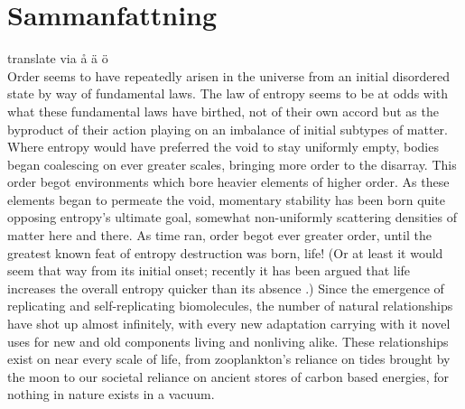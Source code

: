


\chapter{Sammanfattning}
translate via
\r{a} \"a \"o \\

Order seems to have repeatedly arisen in the universe from an initial disordered state by way of fundamental laws. The law of entropy seems to be at odds with what these fundamental laws have birthed, not of their own accord but as the byproduct of their action playing on an imbalance of initial subtypes of matter. Where entropy would have preferred the void to stay uniformly empty, bodies began coalescing on ever greater scales, bringing more order to the disarray. This order begot environments which bore heavier elements of higher order. As these elements began to permeate the void, momentary stability has been born quite opposing entropy's ultimate goal, somewhat non-uniformly scattering densities of matter here and there. As time ran, order begot ever greater order, until the greatest known feat of entropy destruction was born, life! (Or at least it would seem that way from its initial onset; recently it has been argued that life increases the overall entropy quicker than its absence \citep{england2013statistical}.) Since the emergence of replicating and self-replicating biomolecules, the number of natural relationships have shot up almost infinitely, with every new adaptation carrying with it novel uses for new and old components living and nonliving alike. These relationships exist on near every scale of life, from zooplankton's reliance on tides brought by the moon to our societal reliance on ancient stores of carbon based energies, for nothing in nature exists in a vacuum.


